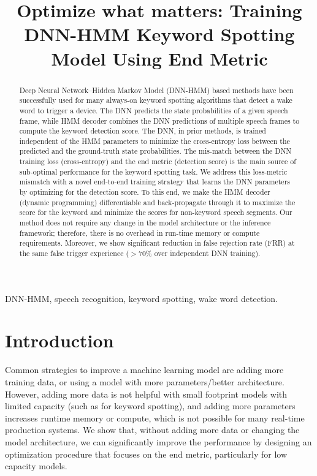 \documentclass{article}
\title{Optimize what matters: Training DNN-HMM Keyword Spotting Model Using End Metric}
\begin{document}
\maketitle
\begin{abstract}
Deep Neural Network--Hidden Markov Model (DNN-HMM) based methods have been successfully used for many always-on keyword spotting algorithms that detect a wake word to trigger a device.
The DNN predicts the state probabilities of a given speech frame, while HMM  decoder combines the DNN predictions of multiple speech frames to compute the keyword detection score.
The DNN, in prior methods, is trained independent of the HMM parameters to minimize the cross-entropy loss between the predicted and the ground-truth state probabilities.
The mis-match between the DNN training loss (cross-entropy) and the end metric (detection score) is the main source of sub-optimal performance for the keyword spotting task.
We address this loss-metric mismatch with a novel end-to-end training strategy that learns the DNN parameters by optimizing for the detection score.
To this end, we make the HMM decoder (dynamic programming) differentiable and back-propagate through it to maximize the score for the keyword and minimize the scores for non-keyword speech segments.
Our method does not require any change in the model architecture or the inference framework; therefore, there is no overhead in run-time memory or compute requirements.
Moreover, we show significant reduction in false rejection rate (FRR) at the same false trigger experience ($> 70\%$ over independent DNN training).




 \end{abstract}

\begin{keywords}
DNN-HMM, speech recognition, keyword spotting, wake word detection.
\end{keywords}
\section{Introduction}
Common strategies to improve a machine learning model are adding more training data, or using a model with more parameters/better architecture.
However, adding more data is not helpful with small footprint models with limited capacity (such as for keyword spotting), and adding more parameters increases runtime memory or compute, which is not possible for many real-time production systems.
We show that, without adding more data or changing the model architecture, we can significantly improve the performance by designing an optimization procedure that focuses on the end metric, particularly for low capacity models.
\end{document}
